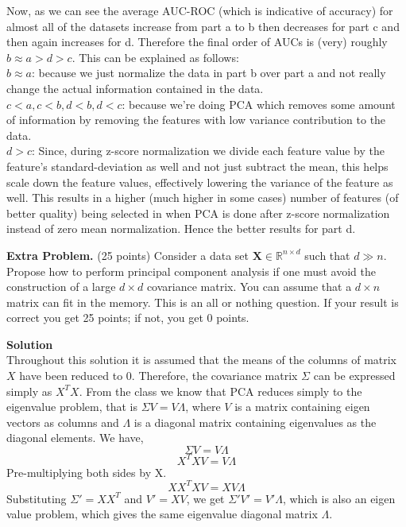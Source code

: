 \documentclass[twoside]{article}
\begin{document}
	
Now, as we can see the average AUC-ROC (which is indicative of accuracy) for almost all of the datasets increase from part a to b then decreases for part c and then again increases for d. Therefore the final order of AUCs is (very) roughly $b \approx a > d > c$. This can be explained as follows:\\
$b \approx a$: because we just normalize the data in part b over part a and not really change the actual information contained in the data. \\
$c < a, c < b, d < b, d < c$: because we're doing PCA which removes some amount of information by removing the features with low variance contribution to the data.\\
$d > c$: Since, during z-score normalization we divide each feature value by the feature's standard-deviation as well and not just subtract the mean, this helps scale down the feature values, effectively lowering the variance of the feature as well. This results in a higher (much higher in some cases) number of features (of better quality) being selected in when PCA is done after z-score normalization instead of zero mean normalization. Hence the better results for part d.


\newpage

\textbf{Extra Problem.} (25 points) Consider a data set $\mathbf{X}\in\mathbb{R}^{n\times d}$ such that $d\gg n$. Propose how to perform principal component analysis if one must avoid the construction of a large $d\times d$ covariance matrix. You can assume that a $d \times n$ matrix can fit in the memory. This is an all or nothing question. If your result is correct you get 25 points; if not, you get 0 points.


\textbf{Solution}\\

Throughout this solution it is assumed that the means of the columns of matrix $X$ have been reduced to 0. Therefore, the covariance matrix $\Sigma$ can be expressed simply as $X^T X$. From the class we know that PCA reduces simply to the eigenvalue problem, that is $\Sigma V = V \Lambda$, where $V$ is a matrix containing eigen vectors as columns and $\Lambda$ is a diagonal matrix containing eigenvalues as the diagonal elements. We have,
\begin{equation*}
	\Sigma V = V \Lambda
\end{equation*}
\begin{equation*}
	X^TX V = V \Lambda
\end{equation*}
Pre-multiplying both sides by X.
\begin{equation*}
	XX^TX V = XV \Lambda
\end{equation*}
Substituting $\Sigma' = XX^T$ and $V' = XV$, we get $\Sigma' V' = V' \Lambda$, which is also an eigen value problem, which gives the same eigenvalue diagonal matrix $\Lambda$.
\end{document}
